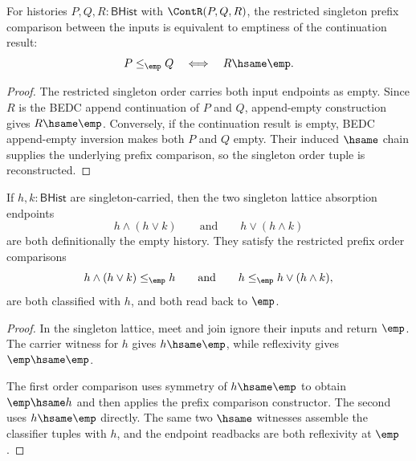 \begin{theorem}
\label{thm:lattice-singleton-le-continuation-empty-result}
For histories $P,Q,R:\mathsf{BHist}$ with $\ContR(P,Q,R)$, the restricted
singleton prefix comparison between the inputs is equivalent to emptiness of the
continuation result:
$$
P\le_{\emp} Q
\quad\Longleftrightarrow\quad
R\hsame\emp.
$$
\end{theorem}
\begin{proof}
The restricted singleton order carries both input endpoints as empty. Since
$R$ is the BEDC append continuation of $P$ and $Q$, append-empty construction
gives $R\hsame\emp$. Conversely, if the continuation result is empty, BEDC
append-empty inversion makes both $P$ and $Q$ empty. Their induced
$\hsame$ chain supplies the underlying prefix comparison, so the singleton
order tuple is reconstructed.
\end{proof}

\begin{theorem}
\label{thm:lattice-singleton-meet-join-absorption-order-classifier}
If $h,k:\mathsf{BHist}$ are singleton-carried, then the two singleton lattice
absorption endpoints
$$
h\wedge(h\vee k)
\qquad\text{and}\qquad
h\vee(h\wedge k)
$$
are both definitionally the empty history. They satisfy the restricted prefix
order comparisons
$$
h\wedge(h\vee k)\le_{\emp} h
\qquad\text{and}\qquad
h\le_{\emp} h\vee(h\wedge k),
$$
are both classified with $h$, and both read back to $\emp$.
\end{theorem}
\begin{proof}
In the singleton lattice, meet and join ignore their inputs and return $\emp$.
The carrier witness for $h$ gives $h\hsame\emp$, while reflexivity gives
$\emp\hsame\emp$.

The first order comparison uses symmetry of $h\hsame\emp$ to obtain
$\emp\hsame h$ and then applies the prefix comparison constructor. The second
uses $h\hsame\emp$ directly. The same two $\hsame$ witnesses assemble the
classifier tuples with $h$, and the endpoint readbacks are both reflexivity at
$\emp$.
\end{proof}

